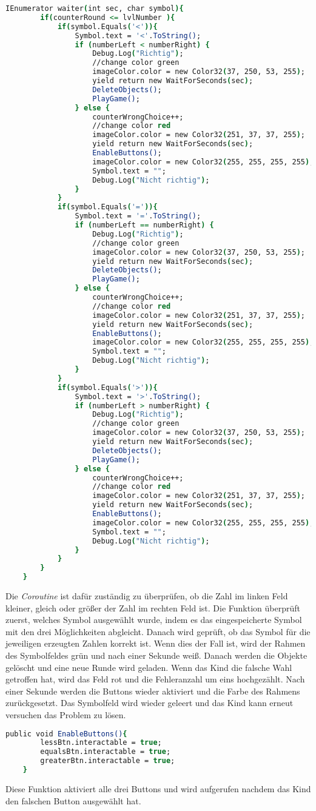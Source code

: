 \begin{lstlisting}[language=csh, caption={GameQuantities.cs waiter-Coroutine}]
IEnumerator waiter(int sec, char symbol){
		if(counterRound <= lvlNumber ){
			if(symbol.Equals('<')){
				Symbol.text = '<'.ToString();
				if (numberLeft < numberRight) {
					Debug.Log("Richtig");
					//change color green
					imageColor.color = new Color32(37, 250, 53, 255);
					yield return new WaitForSeconds(sec);
					DeleteObjects();
					PlayGame();
				} else {
					counterWrongChoice++;
					//change color red
					imageColor.color = new Color32(251, 37, 37, 255);
					yield return new WaitForSeconds(sec);
					EnableButtons();
					imageColor.color = new Color32(255, 255, 255, 255);
					Symbol.text = "";
					Debug.Log("Nicht richtig");
				}
			}
			if(symbol.Equals('=')){
				Symbol.text = '='.ToString();
				if (numberLeft == numberRight) {
					Debug.Log("Richtig");
					//change color green
					imageColor.color = new Color32(37, 250, 53, 255);
					yield return new WaitForSeconds(sec);
					DeleteObjects();
					PlayGame();
				} else {
					counterWrongChoice++;
					//change color red
					imageColor.color = new Color32(251, 37, 37, 255);
					yield return new WaitForSeconds(sec);
					EnableButtons();
					imageColor.color = new Color32(255, 255, 255, 255);
					Symbol.text = "";
					Debug.Log("Nicht richtig");
				}
			}
			if(symbol.Equals('>')){
				Symbol.text = '>'.ToString();
				if (numberLeft > numberRight) {
					Debug.Log("Richtig");
					//change color green
					imageColor.color = new Color32(37, 250, 53, 255);
					yield return new WaitForSeconds(sec);
					DeleteObjects();
					PlayGame();
				} else {
					counterWrongChoice++;
					//change color red
					imageColor.color = new Color32(251, 37, 37, 255);
					yield return new WaitForSeconds(sec);
					EnableButtons();
					imageColor.color = new Color32(255, 255, 255, 255);
					Symbol.text = "";
					Debug.Log("Nicht richtig");
				}
			}
		}
	}
\end{lstlisting}
Die \textit{Coroutine} ist dafür zuständig zu überprüfen, ob die Zahl im linken Feld kleiner, gleich oder größer der Zahl im rechten Feld ist. Die Funktion überprüft zuerst, welches Symbol ausgewählt wurde, indem es das eingespeicherte Symbol mit den drei Möglichkeiten abgleicht. Danach wird geprüft, ob das Symbol für die jeweiligen erzeugten Zahlen korrekt ist. Wenn dies der Fall ist, wird der Rahmen des Symbolfeldes grün und nach einer Sekunde weiß. Danach werden die Objekte gelöscht und eine neue Runde wird geladen. Wenn das Kind die falsche Wahl getroffen hat, wird das Feld rot und die Fehleranzahl um eins hochgezählt. Nach einer Sekunde werden die Buttons wieder aktiviert und die Farbe des Rahmens zurückgesetzt. Das Symbolfeld wird wieder geleert und das Kind kann erneut versuchen das Problem zu lösen.\\
\begin{lstlisting}[language=csh, caption={GameQuantities.cs EnableButtons-Funktion}]
	public void EnableButtons(){
		lessBtn.interactable = true;
		equalsBtn.interactable = true;
		greaterBtn.interactable = true;
	}
\end{lstlisting}
Diese Funktion aktiviert alle drei Buttons und wird aufgerufen nachdem das Kind den falschen Button ausgewählt hat.
